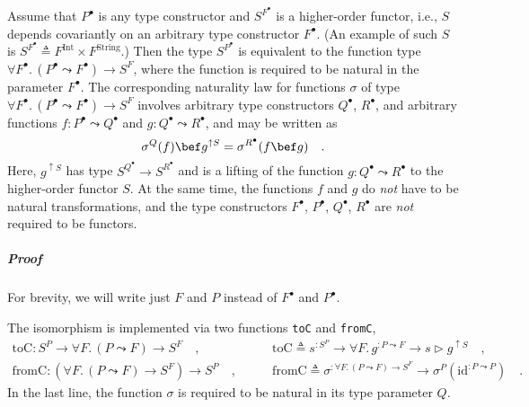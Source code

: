Assume that $P^{\bullet}$ is any type constructor and $S^{F^{\bullet}}$
is a higher-order functor,
i.e., $S$ depends covariantly on an arbitrary type constructor $F^{\bullet}$.
(An example of such $S$ is $S^{F^{\bullet}}\triangleq F^{\text{Int}}\times F^{\text{String}}$.)
Then the type $S^{P^{\bullet}}$ is equivalent to the function type
$\forall F^{\bullet}.\,(P^{\bullet}\leadsto F^{\bullet})\rightarrow S^{F}$,
where the function is required to be natural in the parameter $F^{\bullet}$.
The corresponding naturality law for functions $\sigma$ of type $\forall F^{\bullet}.\,(P^{\bullet}\leadsto F^{\bullet})\rightarrow S^{F}$
involves arbitrary type constructors $Q^{\bullet}$, $R^{\bullet}$,
and arbitrary functions $f:P^{\bullet}\leadsto Q^{\bullet}$ and $g:Q^{\bullet}\leadsto R^{\bullet}$,
and may be written as
\begin{equation}
\sigma^{Q}(f)\bef g^{\uparrow S}=\sigma^{R^{\bullet}}(f\bef g)\quad.\label{eq:assumed-naturality-of-argument-sigma}
\end{equation}
Here, $g^{\uparrow S}$ has type $S^{Q^{\bullet}}\rightarrow S^{R^{\bullet}}$
and is a lifting of the function $g:Q^{\bullet}\leadsto R^{\bullet}$
to the higher-order functor $S$. At the same time, the functions
$f$ and $g$ do \emph{not} have to be natural transformations, and
the type constructors $F^{\bullet}$, $P^{\bullet}$, $Q^{\bullet}$,
$R^{\bullet}$ are \emph{not} required to be functors.

\subparagraph{Proof}

For brevity, we will write just $F$ and $P$ instead of $F^{\bullet}$
and $P^{\bullet}$.

The isomorphism is implemented via two functions \lstinline!toC!
and \lstinline!fromC!,
\begin{align*}
\text{toC}:S^{P}\rightarrow\forall F.\,(P\leadsto F)\rightarrow S^{F}\quad, & \quad\quad\text{toC}\triangleq s^{:S^{P}}\rightarrow\forall F.\,g^{:P\leadsto F}\rightarrow s\triangleright g^{\uparrow S}\quad,\\
\text{fromC}:(\forall F.\,(P\leadsto F)\rightarrow S^{F})\rightarrow S^{P}\quad, & \quad\quad\text{fromC}\triangleq\sigma^{:\forall F.\,(P\leadsto F)\rightarrow S^{F}}\rightarrow\sigma^{P}(\text{id}^{:P\leadsto P})\quad.
\end{align*}
In the last line, the function $\sigma$ is required to be natural
in its type parameter $Q$.

